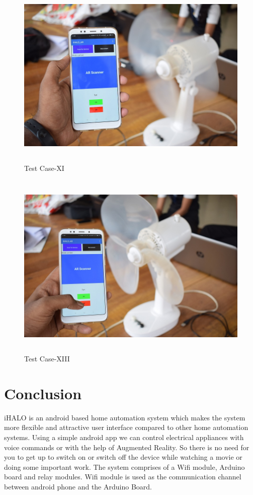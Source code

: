 \begin{figure}[H]
	
	\centering
	\includegraphics[width=\linewidth,height=9cm] {./images/p42.jpg}
	\caption{Test Case-XI}
	\label{manual}
\end{figure}

\begin{figure}[H]
	
	\centering
	\includegraphics[width=\linewidth,height=9cm] {./images/p43.jpg}
	\caption{Test Case-XIII}
	\label{manual}
\end{figure}

\chapter{Conclusion}
\thispagestyle{fancy}
iHALO is an android based home automation system which makes the system more flexible and attractive user interface compared to other home automation systems. Using a simple android app we can control electrical appliances with voice commands or with the help of Augmented Reality. So there is no need for you to get up to switch on or switch off the device while watching a movie or doing some important work. The system comprises of a Wifi module, Arduino board and relay modules. Wifi module is used as the communication channel between android phone and the Arduino Board.

